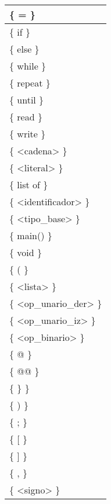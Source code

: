 \begin{center}
\begin{table}[!h]
\begin{tabular}{| l |}
    \{ = \} \\ \hline
    \{ if \} \\ \hline
    \{ else \} \\ \hline
    \{ while \} \\ \hline
    \{ repeat \} \\ \hline
    \{ until \} \\ \hline
    \{ read \} \\ \hline
    \{ write \} \\ \hline
    \{ <cadena> \} \\ \hline
    \{ <literal> \} \\ \hline
    \{ list of \} \\ \hline
    \{ <identificador> \} \\ \hline
    \{ <tipo_base> \} \\ \hline
    \{ main() \} \\ \hline
    \{ void \} \\ \hline
    \{ ( \} \\ \hline
    \{ <lista> \} \\ \hline
    \{ <op_unario_der> \} \\ \hline
    \{ <op_unario_iz> \} \\ \hline
    \{ <op_binario> \} \\ \hline
    \{ @ \} \\ \hline
    \{ @@ \} \\ \hline
    \{ \} \} \\ \hline
    \{ ) \} \\ \hline
    \{ ; \} \\ \hline
    \{ [ \} \\ \hline
    \{ ] \} \\ \hline
    \{ , \} \\ \hline
    \{ <signo> \} \\ \hline
  \end{tabular}
\end{table}
\end{center}
